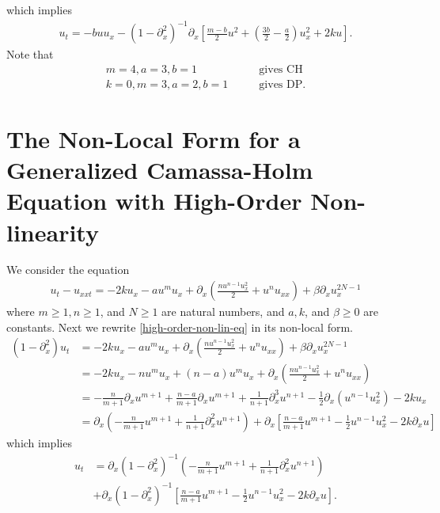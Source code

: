 \documentclass[12pt,reqno]{amsart}
\numberwithin{equation}{section}  %
\numberwithin{figure}{section}
\newcommand{\p}{\partial}
\theoremstyle{plain}
\theoremstyle{definition}
\theoremstyle{remark}
\begin{document}
%
%
which implies
%
%
\begin{equation}
	\label{gen-CH-non-local}
	\begin{split}
		u_{t} = -buu_{x} - (1- \p_x^2)^{-1} \p_x \left[ \frac{m-b}{2}u^{2} + \left(
		\frac{3b}{2} - \frac{a}{2} \right)u_{x}^2 + 2k u\right].
	\end{split}
\end{equation}
%
%
Note that 
%
%
\begin{equation*}
	\begin{split}
		 m=4, a=3, b=1 \qquad & \text{gives CH}
		\\
		k = 0, m=3, a=2, b=1 \qquad & \text{gives DP}.
	\end{split}
\end{equation*}
%
%
\section{The Non-Local Form for a Generalized Camassa-Holm Equation with
High-Order Non-linearity}
%
%
We consider the equation
%
%
\begin{equation}
	\label{high-order-non-lin-eq}
	\begin{split}
		u_{t} - u_{xxt} = -2k u_{x} - a u^{m}u_{x} + \p_x \left( \frac{n
		u^{n-1}u_{x}^2}{2} + u^{n}u_{xx} \right) + \beta \p_x u_{x}^{2N-1}
	\end{split}
\end{equation}
%
%
where $m \ge 1, n \ge 1$, and $N \ge 1$ are natural numbers, and $a, k$, and
$\beta \ge 0$ are constants. Next we rewrite \eqref{high-order-non-lin-eq} in
its non-local form.
%
%
\begin{equation*}
	\begin{split}
		(1 - \p_x^2)u_{t}
		& = -2ku_x - a u^{m}u_{x} + \p_x \left( \frac{nu^{n-1}u_{x}^2}{2} +
		u^{n}u_{xx} \right) + \beta \p_x u_{x}^{2N-1}
		\\
		& = -2k u_{x} - nu^{m}u_{x} + (n-a)u^{m}u_{x} + \p_x \left(
		\frac{nu^{n-1}u_{x}^2}{2} + u^{n}u_{xx} \right)
		\\
		& = -\frac{n}{m+1}\p_x u^{m+1} + \frac{n-a}{m+1}\p_x u^{m+1} +
		\frac{1}{n+1} \p_x^3 u^{n+1} - \frac{1}{2} \p_x (u^{n-1}u_{x}^2) - 2ku_x
		\\
		& = \p_x \left( -\frac{n}{m+1} u^{m+1} + \frac{1}{n+1} \p_x^{2}u^{n+1}
		\right) + \p_x \left[ \frac{n-a}{m+1}u^{m+1} -
		\frac{1}{2}u^{n-1}u_{x}^2 - 2k \p_x u \right]
	\end{split}
\end{equation*}
%
%
which implies
%
%
\begin{equation}
	\label{high-nl-non-local}
	\begin{split}
		u_t
		& = \p_x (1-\p_x^2)^{-1} \left( -\frac{n}{m+1} u^{m+1} + \frac{1}{n+1} \p_x^{2}u^{n+1}
		\right)
		\\
		& + \p_x (1-\p_x^2)^{-1} \left[ \frac{n-a}{m+1}u^{m+1} -
		\frac{1}{2}u^{n-1}u_{x}^2 - 2k \p_x u \right].
	\end{split}
\end{equation}
\end{document}
